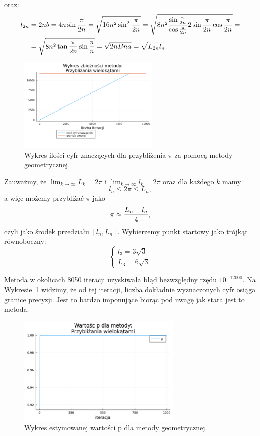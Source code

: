 oraz:
\begin{align*}
    l_{2n}&=2nb=4n\sin{\pi\over 2n}=\sqrt{16n^2\sin^2{\pi\over 2n}}=\sqrt{8n^2{\sin{\pi\over2n}\over\cos{\pi\over 2n}}2\sin{\pi\over 2n}\cos{\pi\over 2n}}=\\
    &=\sqrt{8n^2\tan{\pi\over 2n}\sin{\pi\over n}}=\sqrt{2nBna}=\sqrt{L_{2n}l_n}.
\end{align*}
\begin{figure}[!h]\centering
    \renewcommand{\figurename}{Wykres}
    \includegraphics[width=0.6\textwidth]{../prog/geo3_log_error.png}
    \caption{Wykres ilości cyfr znaczących dla przybliżenia $\pi$ za pomocą metody geometrycznej.}
    \label{geometric-error}
\end{figure}

Zauważmy, że $\lim_{k\to\infty}L_k=2\pi$ i $\lim_{k\to\infty}l_k=2\pi$ oraz dla każdego $k$ mamy
$$l_n\leq 2\pi\leq L_n,$$
a więc możemy przybliżać $\pi$ jako
$$\pi\approx{L_n-l_n\over 4},$$
czyli jako środek przedziału $[l_n,L_n]$. Wybierzemy punkt startowy jako trójkąt równoboczny:
$$\begin{cases}
    l_3=3\sqrt3\\
    L_3=6\sqrt3
\end{cases}$$

Metoda w okolicach 8050 iteracji uzyskiwała błąd bezwzględny rzędu $10^{-12000}$. Na Wykresie~\ref{geometric-error} widzimy, że od tej iteracji, liczba dokładnie wyznaczonych cyfr osiąga granice precyzji. Jest to bardzo imponujące biorąc pod uwagę jak stara jest to metoda.

\begin{figure}[!h]\centering
    \renewcommand{\figurename}{Wykres}
    \includegraphics[width=0.7\textwidth]{../prog/geo3_error_ratio.png}
    \caption{Wykres estymowanej wartości p dla metody geometrycznej.}
    \label{geometric-convergence}
\end{figure}

